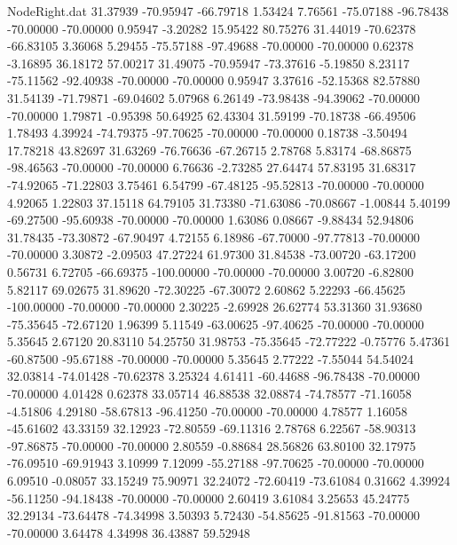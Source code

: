 \begin{filecontents}{NodeRight.dat}
  31.37939  -70.95947  -66.79718     1.53424    7.76561  -75.07188  -96.78438  -70.00000  -70.00000    0.95947   -3.20282   15.95422   80.75276
  31.44019  -70.62378  -66.83105     3.36068    5.29455  -75.57188  -97.49688  -70.00000  -70.00000    0.62378   -3.16895   36.18172   57.00217
  31.49075  -70.95947  -73.37616    -5.19850    8.23117  -75.11562  -92.40938  -70.00000  -70.00000    0.95947    3.37616  -52.15368   82.57880
  31.54139  -71.79871  -69.04602     5.07968    6.26149  -73.98438  -94.39062  -70.00000  -70.00000    1.79871   -0.95398   50.64925   62.43304
  31.59199  -70.18738  -66.49506     1.78493    4.39924  -74.79375  -97.70625  -70.00000  -70.00000    0.18738   -3.50494   17.78218   43.82697
  31.63269  -76.76636  -67.26715     2.78768    5.83174  -68.86875  -98.46563  -70.00000  -70.00000    6.76636   -2.73285   27.64474   57.83195
  31.68317  -74.92065  -71.22803     3.75461    6.54799  -67.48125  -95.52813  -70.00000  -70.00000    4.92065    1.22803   37.15118   64.79105
  31.73380  -71.63086  -70.08667    -1.00844    5.40199  -69.27500  -95.60938  -70.00000  -70.00000    1.63086    0.08667   -9.88434   52.94806
  31.78435  -73.30872  -67.90497     4.72155    6.18986  -67.70000  -97.77813  -70.00000  -70.00000    3.30872   -2.09503   47.27224   61.97300
  31.84538  -73.00720  -63.17200     0.56731    6.72705  -66.69375 -100.00000  -70.00000  -70.00000    3.00720   -6.82800    5.82117   69.02675
  31.89620  -72.30225  -67.30072     2.60862    5.22293  -66.45625 -100.00000  -70.00000  -70.00000    2.30225   -2.69928   26.62774   53.31360
  31.93680  -75.35645  -72.67120     1.96399    5.11549  -63.00625  -97.40625  -70.00000  -70.00000    5.35645    2.67120   20.83110   54.25750
  31.98753  -75.35645  -72.77222    -0.75776    5.47361  -60.87500  -95.67188  -70.00000  -70.00000    5.35645    2.77222   -7.55044   54.54024
  32.03814  -74.01428  -70.62378     3.25324    4.61411  -60.44688  -96.78438  -70.00000  -70.00000    4.01428    0.62378   33.05714   46.88538
  32.08874  -74.78577  -71.16058    -4.51806    4.29180  -58.67813  -96.41250  -70.00000  -70.00000    4.78577    1.16058  -45.61602   43.33159
  32.12923  -72.80559  -69.11316     2.78768    6.22567  -58.90313  -97.86875  -70.00000  -70.00000    2.80559   -0.88684   28.56826   63.80100
  32.17975  -76.09510  -69.91943     3.10999    7.12099  -55.27188  -97.70625  -70.00000  -70.00000    6.09510   -0.08057   33.15249   75.90971
  32.24072  -72.60419  -73.61084     0.31662    4.39924  -56.11250  -94.18438  -70.00000  -70.00000    2.60419    3.61084    3.25653   45.24775
  32.29134  -73.64478  -74.34998     3.50393    5.72430  -54.85625  -91.81563  -70.00000  -70.00000    3.64478    4.34998   36.43887   59.52948

\end{filecontents}
